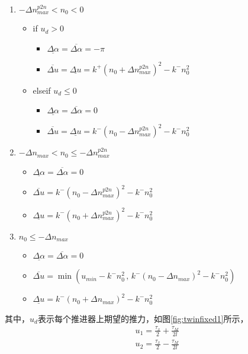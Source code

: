 \begin{enumerate}
  \item $-\Delta n_{max}^{p2n} < n_0 < 0$
  \begin{itemize}
    \item if $u_d > 0$
    \begin{itemize}
      \item $\underline{\Delta \alpha} = \overline{\Delta \alpha} = -\pi$
      \item $\overline{\Delta u}= \underline{\Delta u}=
      k^+ (n_0 + \Delta n_{max}^{p2n})^2 - k^- n_0^2$
    \end{itemize}
    \item elseif $u_d \leq 0$
    \begin{itemize}
      \item $\underline{\Delta \alpha} = \overline{\Delta \alpha} = 0$
      \item $\overline{\Delta u}= \underline{\Delta u}=
      k^- (n_0 - \Delta n_{max}^{p2n})^2 - k^- n_0^2$
    \end{itemize}
  \end{itemize}

  \item $-\Delta n_{max} < n_0 \leq -\Delta n_{max}^{p2n} $
  \begin{itemize}
    \item $\underline{\Delta \alpha} = \overline{\Delta \alpha} = 0$
    \item $\overline{\Delta u}= k^- (n_0 - \Delta n_{max}^{p2n})^2 - k^- n_0^2$
    \item $\underline{\Delta u}=k^- (n_0 + \Delta n_{max}^{p2n})^2 - k^- n_0^2 $
  \end{itemize}

  \item $n_0 \leq -\Delta n_{max}$
  \begin{itemize}
    \item $\underline{\Delta \alpha} = \overline{\Delta \alpha} = 0$
    \item $\overline{\Delta u}= \min \left( u_{min}-k^- n_0^2 \, , \,
    k^- (n_0 - \Delta n_{max})^2 - k^- n_0^2 \right)$
    \item $\underline{\Delta u}=k^- (n_0 + \Delta n_{max})^2 - k^- n_0^2 $
  \end{itemize}
\end{enumerate}

其中，$ u_d $表示每个推进器上期望的推力，如图\ref{fig:twinfixed1}所示，
\begin{equation}
  \begin{aligned}
    &u_1 = \frac{\tau_x}{2} + \frac{\tau_M}{2 l} \\
    &u_2 = \frac{\tau_x}{2} - \frac{\tau_M}{2 l} \\
  \end{aligned}
\end{equation}

